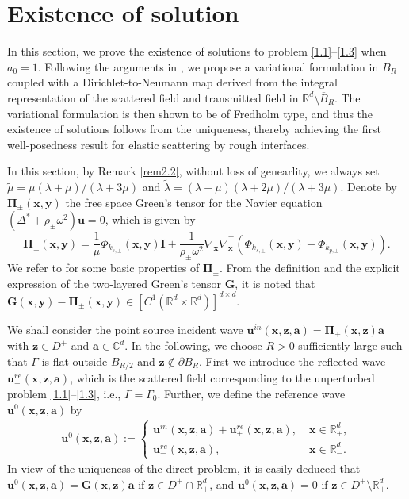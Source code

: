 \documentclass[final,reqno]{siamltex}
\newcommand{\om}{\omega}
\newcommand{\pa}{\partial}
\newcommand{\ov}{\overline}
\newcommand{\mat}{\mathbb}
\newcommand{\R}{{\mat R}}
\newcommand{\C}{{\mat C}}
\begin{document}
\section{Existence of solution}\label{sec4}
\setcounter{equation}{0}
In this section, we prove the existence of solutions to problem \eqref{1.1}--\eqref{1.3} when $a_0=1$. Following the arguments in \cite{GXY18,GGT18}, we propose a variational formulation in $B_R$ coupled with a Dirichlet-to-Neumann map derived from the integral representation of the scattered field and transmitted field in $\R^d\setminus\ov B_R$. The variational formulation is then shown to be of Fredholm type, and thus the existence of solutions follows from the uniqueness, thereby achieving the first well-posedness result for elastic scattering by rough interfaces. 

In this section, by Remark \ref{rem2.2}, without loss of genearlity, we always set $\tilde{\mu}=\mu(\lambda+\mu)/(\lambda+3\mu)$ and $\tilde{\lambda}=(\lambda+\mu)(\lambda+2\mu)/(\lambda+3\mu)$. Denote by $\boldsymbol{\Pi}_\pm(\mathbf{x},\mathbf{y})$ the free space Green's tensor for the Navier equation $(\Delta^*+\rho_\pm\om^2)\mathbf{u}=0$, which is given by 
$$
  \boldsymbol{\Pi}_\pm(\mathbf{x},\mathbf{y})=\frac{1}{\mu}\Phi_{k_{s,\pm}}(\mathbf{x},\mathbf{y})\mathbf{I}+\frac{1}{\rho_\pm\om^2}\nabla_{\mathbf{x}}\nabla_{\mathbf{x}}^\top(\Phi_{k_{s,\pm}}(\mathbf{x},\mathbf{y})-\Phi_{k_{p,\pm}}(\mathbf{x},\mathbf{y})). 
$$
We refer to \cite{TA01,PH98} for some basic properties of $\boldsymbol{\Pi}_\pm$. From the definition and the explicit expression of the two-layered Green's tensor $\mathbf{G}$, it is noted that $\mathbf{G}(\mathbf{x},\mathbf{y})-\boldsymbol{\Pi}_\pm(\mathbf{x},\mathbf{y})\in [C^1(\R^d\times\R^d)]^{d\times d}$. 

We shall consider the point source incident wave $\mathbf{u}^{in}(\mathbf{x},\mathbf{z},\mathbf{a})=\boldsymbol{\Pi}_+(\mathbf{x},\mathbf{z})\mathbf{a}$ with $\mathbf{z}\in D^+$ and $\mathbf{a}\in\C^d$. In the following, we choose $R>0$ sufficiently large such that $\Gamma$ is flat outside $B_{R/2}$ and $\mathbf{z}\notin\pa B_R$. First we introduce the reflected wave $\mathbf{u}^{re}_\pm(\mathbf{x},\mathbf{z},\mathbf{a})$, which is the scattered field corresponding to the unperturbed problem \eqref{1.1}--\eqref{1.3}, i.e., $\Gamma=\Gamma_0$. Further, we define the reference wave $\mathbf{u}^{0}(\mathbf{x},\mathbf{z},\mathbf{a})$ by 
\begin{align*}
\mathbf{u}^{0}(\mathbf{x},\mathbf{z},\mathbf{a}):=
\left\{
\begin{array}{ll}
	\mathbf{u}^{in}(\mathbf{x},\mathbf{z},\mathbf{a})+\mathbf{u}^{re}_+(\mathbf{x},\mathbf{z},\mathbf{a}),\;&\mathbf{x}\in\R^d_+,\\ [1mm]
	\mathbf{u}^{re}_-(\mathbf{x},\mathbf{z},\mathbf{a}),\;&\mathbf{x}\in\R^d_-. 
\end{array}
\right.
\end{align*}
In view of the uniqueness of the direct problem, it is easily deduced that $\mathbf{u}^{0}(\mathbf{x},\mathbf{z},\mathbf{a})=\mathbf{G}(\mathbf{x},\mathbf{z})\mathbf{a}$ if $\mathbf{z}\in D^+\cap\R^d_+$, and $\mathbf{u}^{0}(\mathbf{x},\mathbf{z},\mathbf{a})=0$ if $\mathbf{z}\in D^+\setminus\R^d_+$. 
\end{document}
